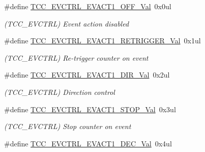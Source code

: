 \begin{DoxyCompactItemize}
\item 
\hypertarget{group___s_a_m_l21___t_c_c_ga49597ad47ecd4badc3bc7d5f4f2ff7e5}{}\#define \hyperlink{group___s_a_m_l21___t_c_c_ga49597ad47ecd4badc3bc7d5f4f2ff7e5}{T\+C\+C\+\_\+\+E\+V\+C\+T\+R\+L\+\_\+\+E\+V\+A\+C\+T1\+\_\+\+O\+F\+F\+\_\+\+Val}~0x0ul\label{group___s_a_m_l21___t_c_c_ga49597ad47ecd4badc3bc7d5f4f2ff7e5}

\begin{DoxyCompactList}\small\item\em (T\+C\+C\+\_\+\+E\+V\+C\+T\+R\+L) Event action disabled \end{DoxyCompactList}\item 
\hypertarget{group___s_a_m_l21___t_c_c_ga9d2f6884ed5da6e3248172b59236b562}{}\#define \hyperlink{group___s_a_m_l21___t_c_c_ga9d2f6884ed5da6e3248172b59236b562}{T\+C\+C\+\_\+\+E\+V\+C\+T\+R\+L\+\_\+\+E\+V\+A\+C\+T1\+\_\+\+R\+E\+T\+R\+I\+G\+G\+E\+R\+\_\+\+Val}~0x1ul\label{group___s_a_m_l21___t_c_c_ga9d2f6884ed5da6e3248172b59236b562}

\begin{DoxyCompactList}\small\item\em (T\+C\+C\+\_\+\+E\+V\+C\+T\+R\+L) Re-\/trigger counter on event \end{DoxyCompactList}\item 
\hypertarget{group___s_a_m_l21___t_c_c_gaa4361ca908de2ee8ebbbde80cf4df719}{}\#define \hyperlink{group___s_a_m_l21___t_c_c_gaa4361ca908de2ee8ebbbde80cf4df719}{T\+C\+C\+\_\+\+E\+V\+C\+T\+R\+L\+\_\+\+E\+V\+A\+C\+T1\+\_\+\+D\+I\+R\+\_\+\+Val}~0x2ul\label{group___s_a_m_l21___t_c_c_gaa4361ca908de2ee8ebbbde80cf4df719}

\begin{DoxyCompactList}\small\item\em (T\+C\+C\+\_\+\+E\+V\+C\+T\+R\+L) Direction control \end{DoxyCompactList}\item 
\hypertarget{group___s_a_m_l21___t_c_c_ga96c6734b829a2429c9a458dc1f17f74d}{}\#define \hyperlink{group___s_a_m_l21___t_c_c_ga96c6734b829a2429c9a458dc1f17f74d}{T\+C\+C\+\_\+\+E\+V\+C\+T\+R\+L\+\_\+\+E\+V\+A\+C\+T1\+\_\+\+S\+T\+O\+P\+\_\+\+Val}~0x3ul\label{group___s_a_m_l21___t_c_c_ga96c6734b829a2429c9a458dc1f17f74d}

\begin{DoxyCompactList}\small\item\em (T\+C\+C\+\_\+\+E\+V\+C\+T\+R\+L) Stop counter on event \end{DoxyCompactList}\item 
\hypertarget{group___s_a_m_l21___t_c_c_ga50c7b0aee929c3320582370f406fa345}{}\#define \hyperlink{group___s_a_m_l21___t_c_c_ga50c7b0aee929c3320582370f406fa345}{T\+C\+C\+\_\+\+E\+V\+C\+T\+R\+L\+\_\+\+E\+V\+A\+C\+T1\+\_\+\+D\+E\+C\+\_\+\+Val}~0x4ul\label{group___s_a_m_l21___t_c_c_ga50c7b0aee929c3320582370f406fa345}


\end{DoxyCompactItemize}
